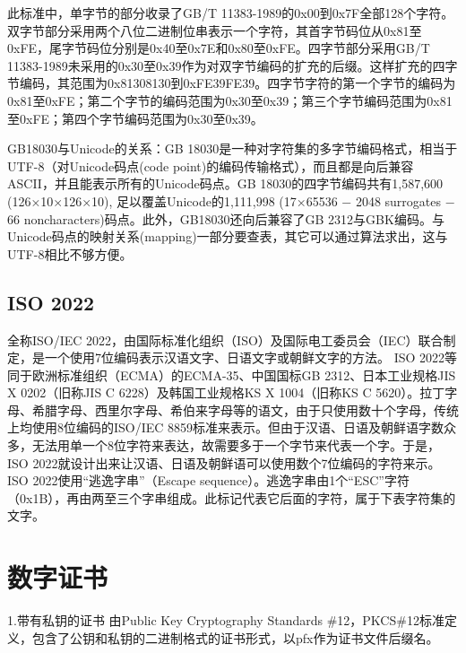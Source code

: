 此标准中，单字节的部分收录了GB/T 11383-1989的0x00到0x7F全部128个字符。双字节部分采用两个八位二进制位串表示一个字符，其首字节码位从0x81至0xFE，尾字节码位分别是0x40至0x7E和0x80至0xFE。四字节部分采用GB/T 11383-1989未采用的0x30至0x39作为对双字节编码的扩充的后缀。这样扩充的四字节编码，其范围为0x81308130到0xFE39FE39。四字节字符的第一个字节的编码为0x81至0xFE；第二个字节的编码范围为0x30至0x39；第三个字节编码范围为0x81至0xFE；第四个字节编码范围为0x30至0x39。

GB18030与Unicode的关系：GB 18030是一种对字符集的多字节编码格式，相当于UTF-8（对Unicode码点(code point)的编码传输格式），而且都是向后兼容ASCII，并且能表示所有的Unicode码点。GB 18030的四字节编码共有1,587,600 (126×10×126×10), 足以覆盖Unicode的1,111,998 (17×65536 − 2048 surrogates − 66 noncharacters)码点。此外，GB18030还向后兼容了GB 2312与GBK编码。与Unicode码点的映射关系(mapping)一部分要查表，其它可以通过算法求出，这与UTF-8相比不够方便。


\subsection{ISO 2022}

全称ISO/IEC 2022，由国际标准化组织（ISO）及国际电工委员会（IEC）联合制定，是一个使用7位编码表示汉语文字、日语文字或朝鲜文字的方法。
ISO 2022等同于欧洲标准组织（ECMA）的ECMA-35、中国国标GB 2312、日本工业规格JIS X 0202（旧称JIS C 6228）及韩国工业规格KS X 1004（旧称KS C 5620）。拉丁字母、希腊字母、西里尔字母、希伯来字母等的语文，由于只使用数十个字母，传统上均使用8位编码的ISO/IEC 8859标准来表示。但由于汉语、日语及朝鲜语字数众多，无法用单一个8位字符来表达，故需要多于一个字节来代表一个字。于是，ISO 2022就设计出来让汉语、日语及朝鲜语可以使用数个7位编码的字符来示。ISO 2022使用“逃逸字串”（Escape sequence）。逃逸字串由1个“ESC”字符（0x1B），再由两至三个字串组成。此标记代表它后面的字符，属于下表字符集的文字。





























\section{数字证书}
1.带有私钥的证书
由Public Key Cryptography Standards \#12，PKCS\#12标准定义，包含了公钥和私钥的二进制格式的证书形式，以pfx作为证书文件后缀名。


